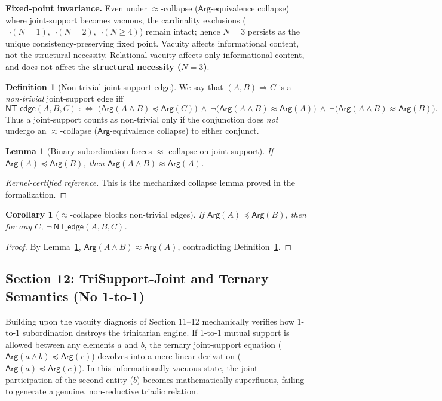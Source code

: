 \documentclass[a4paper, 11pt]{article}
\theoremstyle{plain}
\newtheorem{lemma}{Lemma}[section]
\newtheorem{corollary}{Corollary}[section]
\theoremstyle{definition}
\newtheorem{definition}{Definition}[section]
\newcommand{\Arg}{\mathsf{Arg}}           %
\begin{document}
\vspace{0.5em}
\noindent\textbf{Fixed-point invariance.} Even under $\approx$-collapse ($\Arg$-equivalence collapse) where joint-support becomes vacuous, the cardinality exclusions ($\neg (N=1), \neg (N=2), \neg (N\ge 4)$) remain intact; hence $N=3$ persists as the unique consistency-preserving fixed point. Vacuity affects informational content, not the structural necessity. Relational vacuity affects only informational content, and does not affect the \textbf{structural necessity ($N=3$)}.

\newcommand{\NTedge}{\mathsf{NT\_edge}}

\begin{definition}[Non-trivial joint-support edge]
\label{def:nt_edge}
We say that $(A,B)\Rightarrow C$ is a \emph{non-trivial} joint-support edge iff
\[
\NTedge(A,B,C)\;:\!\!\Longleftrightarrow\;
\bigl(\Arg(A\wedge B)\preceq \Arg(C)\bigr)\ \land\
\neg\bigl(\Arg(A\wedge B)\approx \Arg(A)\bigr)\ \land\
\neg\bigl(\Arg(A\wedge B)\approx \Arg(B)\bigr).
\]
Thus a joint-support counts as non-trivial only if the conjunction does \emph{not}
undergo an $\approx$-collapse ($\Arg$-equivalence collapse) to either conjunct.
\end{definition}

\begin{lemma}[Binary subordination forces $\approx$-collapse on joint support]
\label{lem:subordination_collapse}
If $\Arg(A)\preceq \Arg(B)$, then $\Arg(A\wedge B)\approx \Arg(A)$.
\end{lemma}

\begin{proof}[Kernel-certified reference]
This is the mechanized collapse lemma proved in the formalization.
\end{proof}

\begin{corollary}[$\approx$-collapse blocks non-trivial edges]
\label{cor:collapse_blocks_ntedge}
If $\Arg(A)\preceq \Arg(B)$, then for any $C$, $\neg\,\NTedge(A,B,C)$.
\end{corollary}

\begin{proof}
By Lemma~\ref{lem:subordination_collapse}, $\Arg(A\wedge B)\approx \Arg(A)$, contradicting
Definition~\ref{def:nt_edge}.
\end{proof}

\subsection{Section 12: TriSupport-Joint and Ternary Semantics (No 1-to-1)}
Building upon the vacuity diagnosis of Section 11--12 mechanically verifies how 1-to-1 subordination destroys the trinitarian engine. If 1-to-1 mutual support is allowed between any elements $a$ and $b$, the ternary joint-support equation ($\Arg(a \land b) \preceq \Arg(c)$) devolves into a mere linear derivation ($\Arg(a) \preceq \Arg(c)$). In this informationally vacuous state, the joint participation of the second entity ($b$) becomes mathematically superfluous, failing to generate a genuine, non-reductive triadic relation.
\end{document}
